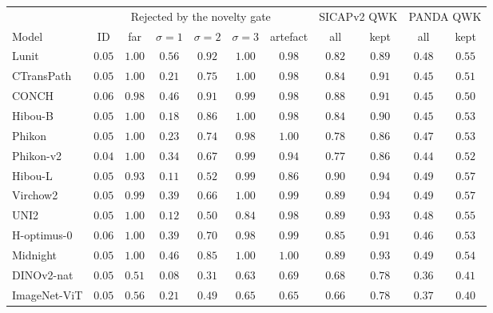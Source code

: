 \begin{tabular}{lcccccccccc}
\toprule
& \multicolumn{6}{c}{Rejected by the novelty gate} & \multicolumn{2}{c}{SICAPv2 QWK} & \multicolumn{2}{c}{PANDA QWK} \\
\cmidrule(lr){2-7}\cmidrule(lr){8-9}\cmidrule(lr){10-11}
Model & ID & far & $\sigma{=}1$ & $\sigma{=}2$ & $\sigma{=}3$ & artefact & all & kept & all & kept \\
\midrule
Lunit & $0.05$ & $1.00$ & $0.56$ & $0.92$ & $1.00$ & $0.98$ & $0.82$ & $0.89$ & $0.48$ & $0.55$ \\
CTransPath & $0.05$ & $1.00$ & $0.21$ & $0.75$ & $1.00$ & $0.98$ & $0.84$ & $0.91$ & $0.45$ & $0.51$ \\
CONCH & $0.06$ & $0.98$ & $0.46$ & $0.91$ & $0.99$ & $0.98$ & $0.88$ & $0.91$ & $0.45$ & $0.50$ \\
Hibou-B & $0.05$ & $1.00$ & $0.18$ & $0.86$ & $1.00$ & $0.98$ & $0.84$ & $0.90$ & $0.45$ & $0.53$ \\
Phikon & $0.05$ & $1.00$ & $0.23$ & $0.74$ & $0.98$ & $1.00$ & $0.78$ & $0.86$ & $0.47$ & $0.53$ \\
Phikon-v2 & $0.04$ & $1.00$ & $0.34$ & $0.67$ & $0.99$ & $0.94$ & $0.77$ & $0.86$ & $0.44$ & $0.52$ \\
Hibou-L & $0.05$ & $0.93$ & $0.11$ & $0.52$ & $0.99$ & $0.86$ & $0.90$ & $0.94$ & $0.49$ & $0.57$ \\
Virchow2 & $0.05$ & $0.99$ & $0.39$ & $0.66$ & $1.00$ & $0.99$ & $0.89$ & $0.94$ & $0.49$ & $0.57$ \\
UNI2 & $0.05$ & $1.00$ & $0.12$ & $0.50$ & $0.84$ & $0.98$ & $0.89$ & $0.93$ & $0.48$ & $0.55$ \\
H-optimus-0 & $0.06$ & $1.00$ & $0.39$ & $0.70$ & $0.98$ & $0.99$ & $0.85$ & $0.91$ & $0.46$ & $0.53$ \\
Midnight & $0.05$ & $1.00$ & $0.46$ & $0.85$ & $1.00$ & $1.00$ & $0.89$ & $0.93$ & $0.49$ & $0.54$ \\
\midrule
DINOv2-nat & $0.05$ & $0.51$ & $0.08$ & $0.31$ & $0.63$ & $0.69$ & $0.68$ & $0.78$ & $0.36$ & $0.41$ \\
ImageNet-ViT & $0.05$ & $0.56$ & $0.21$ & $0.49$ & $0.65$ & $0.65$ & $0.66$ & $0.78$ & $0.37$ & $0.40$ \\
\bottomrule
\end{tabular}
